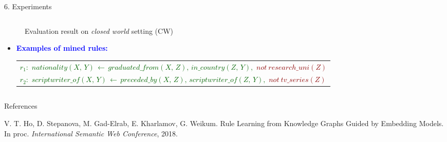 \documentclass[t,final,hyperref={pdfpagelabels=true}]{beamer}
\newcommand{\red}[1]{\textcolor{darkred}{#1}}
\newcommand{\bl}[1]{\textcolor{blue}{#1}}
\newcommand{\gr}[1]{\textcolor{darkgreen}{#1}}
\newcommand{\mi}[1]{\ensuremath{\mathit{#1}}}
\begin{document}
\begin{frame}
\begin{columns}[t]
\begin{column}{0.5\textwidth}
\begin{block}{6. Experiments}
\begin{columns}
\begin{column}{1.02\textwidth}
\begin{figure}[t]
							\caption{Evaluation result on \textit{closed world} setting (CW)}
							\label{fig:diff_lambda}
						\end{figure}
						\small
						\vspace{-0.25em}
						\begin{itemize}
							\item \textbf{\bl{Examples of mined rules:}}
							      
							      
							      				
							      \bigskip
							      				
							      \begin{tabular}{l}
							      	\small                                                                                                                              
							      	\gr{$r_1{:}$  $\mi{nationality(X{,}\, Y)}\, {\leftarrow}\, \mi{graduated\_from(X{,}\, Z)}{,}\, \mi{in\_country(Z{,}\, Y)},$}        
							      	\red{$not\ \mi{research\_uni(Z)}$}                                                                                                  \\
							      	\small                                                                                                                              
							      	\gr{$r_2{:}$  $\mi{scriptwriter\_of}(X{,}\, Y)\, {\leftarrow}\, \mi{preceded\_by(X{,}\, Z)}{,}\, \mi{scriptwriter\_of(Z{,}\, Y)},$} 
							      	\red{$not\ \mi{tv\_series(Z)}$}                                                                                                     
							      \end{tabular} 
						\end{itemize}
					\end{column}
					\begin{column}{.5\textwidth}
					\end{column}
				\end{columns}
			\end{block} 
						
		\end{column}
	\end{columns}
	\begin{columns}[t]
		\begin{column}{.5\textwidth}
			\vspace{-13cm}
			\begin{block}{References}
				\begin{thebibliography}{10}
					\small{\footnotesize{					
						V. T. Ho, D. Stepanova, M. Gad-Elrab, E. Kharlamov, G. Weikum. Rule Learning from Knowledge Graphs Guided by Embedding Models.
						In proc. {\em International Semantic Web Conference}, 2018.
						
}}
\end{thebibliography}
\end{block}
\end{column}
\end{columns}
\end{frame}
\end{document}
